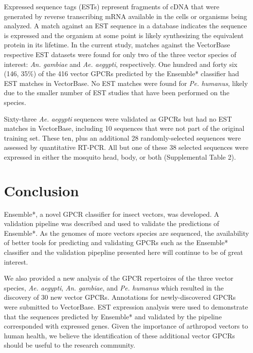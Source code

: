 Expressed sequence tags (ESTs) represent fragments of cDNA that were generated by reverse transcribing mRNA available in the cells or organisms being analyzed. A match against an EST sequence in a database indicates the sequence is expressed and the organism at some point is likely synthesizing the equivalent protein in its lifetime. In the current study, matches against the VectorBase respective EST datasets were found for only two of the three vector species of interest: \emph{An. gambiae} and \emph{Ae. aegypti}, respectively. One hundred and forty six (146, 35\%) of the 416 vector GPCRs predicted by the Ensemble* classifier had EST matches in VectorBase. No EST matches were found for \emph{Pe. humanus}, likely due to the smaller number of EST studies that have been performed on the species. 

Sixty-three \emph{Ae. aegypti} sequences were validated as GPCRs but had no EST matches in VectorBase, including 10 sequences that were not part of the original training set. These ten, plus an additional 28 randomly-selected sequences were assessed by quantitative RT-PCR.  All but one of these 38 selected sequences were expressed in either the mosquito head, body, or both (Supplemental Table 2).   

\section{Conclusion}

Ensemble*, a novel GPCR classifier for insect vectors, was developed.  A validation pipeline was described and used to validate the predictions of Ensemble*.  As the genomes of more vectors species are sequenced, the availability of better tools for predicting and validating GPCRs such as the Ensemble* classifier and the validation pipepline presented here will continue to be of great interest.

We also provided a new analysis of the GPCR repertoires of the three vector species, \emph{Ae. aegypti}, \emph{An. gambiae}, and \emph{Pe. humanus} which resulted in the discovery of 30 new vector GPCRs.  Annotations for newly-discovered GPCRs were submitted to VectorBase.  EST expression analysis were used to demonstrate that the sequences predicted by Ensemble* and validated by the pipeline corresponded with expressed genes.  Given the importance of arthropod vectors to human health, we believe the identification of these additional vector GPCRs should be useful to the research community.  


\newpage

